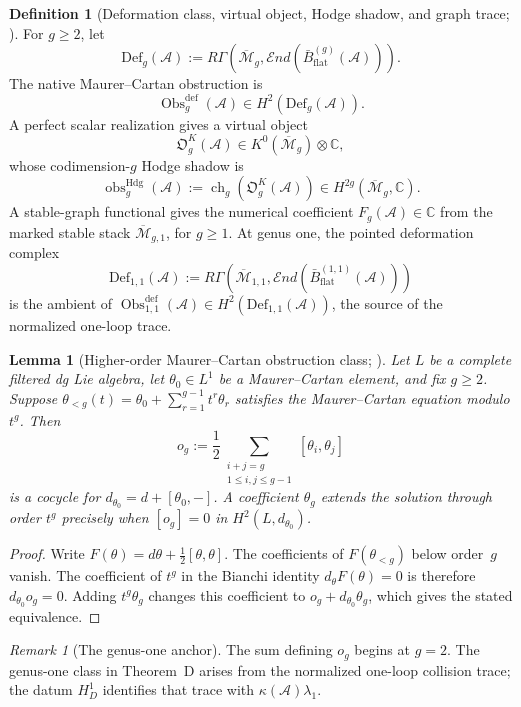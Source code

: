 \documentclass[11pt]{article}
\theoremstyle{plain}
\newtheorem{lemma}[theorem]{Lemma}
\theoremstyle{definition}
\newtheorem{definition}[theorem]{Definition}
\theoremstyle{remark}
\newtheorem{remark}[theorem]{Remark}
\newcommand{\Mbar}{\overline{\mathcal{M}}}
\newcommand{\cA}{\mathcal{A}}
\begin{document}
\begin{definition}[Deformation class, virtual object, Hodge shadow,
and graph trace; \ClaimStatusDefinitional]
\label{def:standalone-theorem-D-objects}
For $g\geq2$, let
\[
 \mathrm{Def}_g(\cA)
 :=R\Gamma\!\left(
 \Mbar_g,\mathcal E nd(\bar B^{(g)}_{\mathrm{flat}}(\cA))
 \right).
\]
The native Maurer--Cartan obstruction is
\[
 \operatorname{Obs}^{\mathrm{def}}_g(\cA)
 \in H^2(\mathrm{Def}_g(\cA)).
\]
A perfect scalar realization gives a virtual object
\[
 \mathfrak O_g^K(\cA)\in K^0(\Mbar_g)\otimes\mathbb C,
\]
whose codimension-\(g\) Hodge shadow is
\[
 \operatorname{obs}^{\mathrm{Hdg}}_g(\cA)
 :=\operatorname{ch}_g(\mathfrak O_g^K(\cA))
 \in H^{2g}(\Mbar_g,\mathbb C).
\]
A stable-graph functional gives the numerical coefficient
\(F_g(\cA)\in\mathbb C\) from the marked stable stack
\(\Mbar_{g,1}\), for $g\geq1$.  At genus one, the pointed deformation
complex
\[
 \mathrm{Def}_{1,1}(\cA)
 :=R\Gamma\!\left(
 \Mbar_{1,1},\mathcal E nd(\bar B^{(1,1)}_{\mathrm{flat}}(\cA))
 \right)
\]
is the ambient of
\(\operatorname{Obs}^{\mathrm{def}}_{1,1}(\cA)
\in H^2(\mathrm{Def}_{1,1}(\cA))\), the source of the normalized
one-loop trace.
\end{definition}

\begin{lemma}[Higher-order Maurer--Cartan obstruction class;
\ClaimStatusProvedHere]
\label{lem:standalone-MC-obstruction}
Let \(L\) be a complete filtered dg Lie algebra, let
\(\theta_0\in L^1\) be a Maurer--Cartan element, and fix \(g\geq2\).
Suppose
\(\theta_{<g}(t)=\theta_0+\sum_{r=1}^{g-1}t^r\theta_r\)
satisfies the Maurer--Cartan equation modulo \(t^g\).  Then
\[
 o_g:=\frac12
 \sum_{\substack{i+j=g\\1\leq i,j\leq g-1}}
 [\theta_i,\theta_j]
\]
is a cocycle for \(d_{\theta_0}=d+[\theta_0,-]\).  A coefficient
\(\theta_g\) extends the solution through order \(t^g\) precisely when
\([o_g]=0\) in \(H^2(L,d_{\theta_0})\).
\end{lemma}

\begin{proof}
Write \(F(\theta)=d\theta+\tfrac12[\theta,\theta]\).  The coefficients
of \(F(\theta_{<g})\) below order~$g$ vanish.  The coefficient of
$t^g$ in the Bianchi identity \(d_\theta F(\theta)=0\) is therefore
\(d_{\theta_0}o_g=0\).  Adding $t^g\theta_g$ changes this coefficient
to \(o_g+d_{\theta_0}\theta_g\), which gives the stated equivalence.
\end{proof}

\begin{remark}[The genus-one anchor]
The sum defining \(o_g\) begins at \(g=2\).  The genus-one class in
Theorem~D arises from the normalized one-loop collision trace; the
datum \(H_D^1\) identifies that trace with
\(\kappa(\cA)\lambda_1\).
\end{remark}
\end{document}
